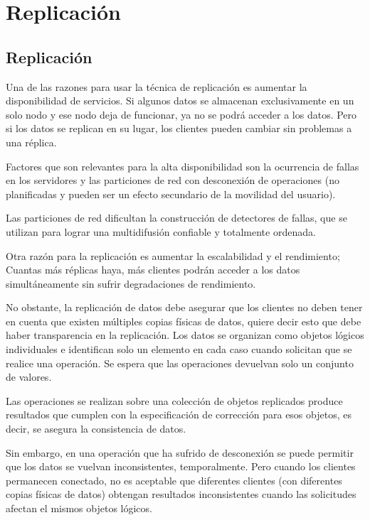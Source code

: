 
\chapter{Replicación}
\label{ch:Replicaci\'on}


\section{Replicaci\'on}

Una de las razones para usar la t\'ecnica de replicación es  aumentar la disponibilidad de servicios.
Si algunos datos se almacenan exclusivamente en un solo nodo y ese nodo deja de funcionar, ya no se podrá acceder a los datos. Pero si los datos se replican en su lugar, los clientes pueden cambiar sin problemas a una réplica.

 Factores que son relevantes para la alta disponibilidad  son la ocurrencia de fallas en los  servidores y las particiones de red con  desconexi\'on de operaciones  (no planificadas y pueden ser un efecto secundario de la movilidad del usuario).
 
 Las particiones de red dificultan la construcción de detectores de fallas,
 que se utilizan para lograr una multidifusión confiable y totalmente ordenada.
  

 Otra razón para la replicación es aumentar la escalabilidad y el rendimiento; Cuantas más réplicas haya, más clientes podrán acceder a los datos simultáneamente sin sufrir degradaciones de rendimiento. 
  \cite{Gorton2022}  \cite{Fekete2010} \cite{Helal1996}

No obstante, la replicaci\'on de datos debe asegurar que   los clientes  no deben tener en cuenta que existen múltiples copias físicas de datos, quiere decir esto que debe haber  transparencia en la replicación. 
Los datos se organizan como objetos lógicos individuales e identifican solo un elemento en cada caso cuando solicitan que se realice una operación. Se 
 espera que las operaciones devuelvan solo un conjunto de valores. 

Las operaciones se realizan sobre una colección de objetos replicados produce resultados que cumplen con la especificación de corrección para esos objetos, es decir, se asegura la  consistencia de datos.

Sin embargo, en una  operación que ha sufrido de desconexi\'on se puede permitir que los datos se vuelvan inconsistentes, temporalmente. Pero cuando los clientes permanecen conectado,  no es aceptable que diferentes clientes (con diferentes copias físicas de datos) obtengan resultados inconsistentes cuando las solicitudes afectan  el mismos objetos lógicos.  
 

